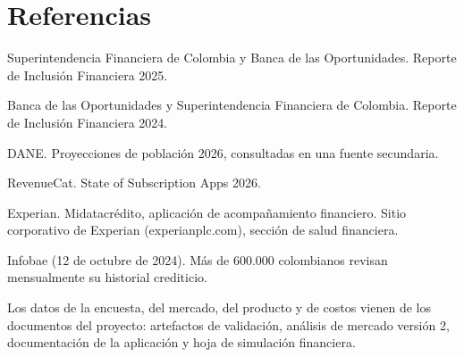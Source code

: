 \documentclass[11pt,a4paper]{article}
\begin{document}
\section{Referencias}

\begin{enumerate}[label={[\arabic*]},leftmargin=2em]
  \item Superintendencia Financiera de Colombia y Banca de las Oportunidades. Reporte de Inclusión Financiera 2025.
  \item Banca de las Oportunidades y Superintendencia Financiera de Colombia. Reporte de Inclusión Financiera 2024.
  \item DANE. Proyecciones de población 2026, consultadas en una fuente secundaria.
  \item RevenueCat. State of Subscription Apps 2026.
  \item Experian. Midatacrédito, aplicación de acompañamiento financiero. Sitio corporativo de Experian (experianplc.com), sección de salud financiera.
  \item Infobae (12 de octubre de 2024). Más de 600.000 colombianos revisan mensualmente su historial crediticio.
\end{enumerate}

Los datos de la encuesta, del mercado, del producto y de costos vienen de los documentos del proyecto: artefactos de validación, análisis de mercado versión 2, documentación de la aplicación y hoja de simulación financiera.
\end{document}
